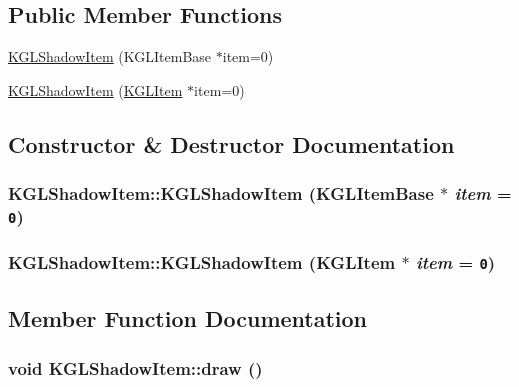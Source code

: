 \subsection*{Public Member Functions}
\begin{CompactItemize}
\item 
\hyperlink{class_k_g_l_shadow_item_71f37660873e0f5c56e8c079bebf0184}{KGLShadowItem} (KGLItemBase $\ast$item=0)
\item 
\hyperlink{class_k_g_l_shadow_item_52005ae1bd9e74b02cfb1212a7d5d06b}{KGLShadowItem} (\hyperlink{class_k_g_l_item}{KGLItem} $\ast$item=0)
\end{CompactItemize}


\subsection{Constructor \& Destructor Documentation}
\hypertarget{class_k_g_l_shadow_item_71f37660873e0f5c56e8c079bebf0184}{
\subsubsection[{KGLShadowItem}]{\setlength{\rightskip}{0pt plus 5cm}KGLShadowItem::KGLShadowItem (KGLItemBase $\ast$ {\em item} = {\tt 0})}}
\label{class_k_g_l_shadow_item_71f37660873e0f5c56e8c079bebf0184}


\hypertarget{class_k_g_l_shadow_item_52005ae1bd9e74b02cfb1212a7d5d06b}{
\subsubsection[{KGLShadowItem}]{\setlength{\rightskip}{0pt plus 5cm}KGLShadowItem::KGLShadowItem ({\bf KGLItem} $\ast$ {\em item} = {\tt 0})}}
\label{class_k_g_l_shadow_item_52005ae1bd9e74b02cfb1212a7d5d06b}




\subsection{Member Function Documentation}
\hypertarget{class_k_g_l_shadow_item_97433b863559d8f38199fe68a5b21bcc}{
\subsubsection[{draw}]{\setlength{\rightskip}{0pt plus 5cm}void KGLShadowItem::draw ()}}
\label{class_k_g_l_shadow_item_97433b863559d8f38199fe68a5b21bcc}




